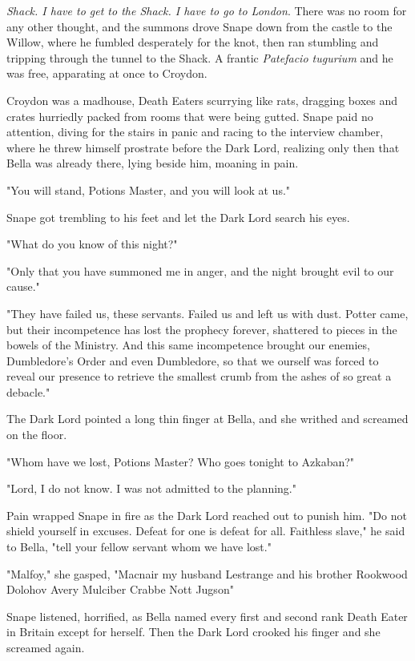 \emph{Shack. I have to get to the Shack. I have to go to London}. There was no room for any other thought, and the summons drove Snape down from the castle to the Willow, where he fumbled desperately for the knot, then ran stumbling and tripping through the tunnel to the Shack. A frantic \emph{Patefacio tugurium} and he was free, apparating at once to Croydon.

Croydon was a madhouse, Death Eaters scurrying like rats, dragging boxes and crates hurriedly packed from rooms that were being gutted. Snape paid no attention, diving for the stairs in panic and racing to the interview chamber, where he threw himself prostrate before the Dark Lord, realizing only then that Bella was already there, lying beside him, moaning in pain.

"You will stand, Potions Master, and you will look at us."

Snape got trembling to his feet and let the Dark Lord search his eyes.

"What do you know of this night?"

"Only that you have summoned me in anger, and the night brought evil to our cause."

"They have failed us, these servants. Failed us and left us with dust. Potter came, but their incompetence has lost the prophecy forever, shattered to pieces in the bowels of the Ministry. And this same incompetence brought our enemies, Dumbledore's Order and even Dumbledore, so that we ourself was forced to reveal our presence to retrieve the smallest crumb from the ashes of so great a debacle."

The Dark Lord pointed a long thin finger at Bella, and she writhed and screamed on the floor.

"Whom have we lost, Potions Master? Who goes tonight to Azkaban?"

"Lord, I do not know. I was not admitted to the planning."

Pain wrapped Snape in fire as the Dark Lord reached out to punish him. "Do not shield yourself in excuses. Defeat for one is defeat for all. Faithless slave," he said to Bella, "tell your fellow servant whom we have lost."

"Malfoy," she gasped, "Macnair{\el} my husband Lestrange and his brother{\el} Rookwood{\el} Dolohov{\el} Avery{\el} Mulciber{\el} Crabbe{\el} Nott{\el} Jugson{\el}"

Snape listened, horrified, as Bella named every first and second rank Death Eater in Britain except for herself. Then the Dark Lord crooked his finger and she screamed again.

